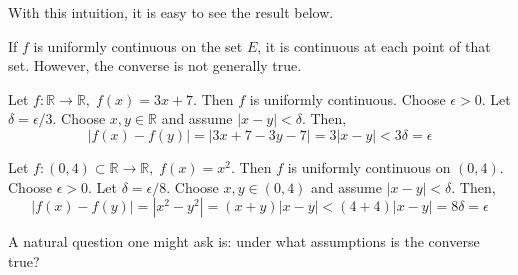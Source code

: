   With this intuition, it is easy to see the result below. 

  \begin{lemma}
    \label{thm:uniform-continuity-implies-continuity}
    If $f$ is uniformly continuous on the set $E$, it is continuous at each point of that set. However, the converse is not generally true. 
  \end{lemma}

  \begin{example}
    \label{ex:3x7-is-uniformly-continuous}
    Let $f: \mathbb{R} \to \mathbb{R}, \; f(x) = 3x+7$. Then $f$ is uniformly continuous. Choose $\epsilon > 0$. Let $\delta = \epsilon / 3$. Choose $x, y \in \mathbb{R}$ and assume $|x-y| < \delta$. Then, 
    \begin{equation}
      | f(x) - f(y) | = | 3x + 7 - 3 y - 7 | = 3 |x-y| < 3 \delta = \epsilon
    \end{equation}
  \end{example}

  \begin{example}
    \label{ex:x2-is-uniformly-continuous-on-a-bounded-interval}
    Let $f: (0, 4) \subset \mathbb{R} \to \mathbb{R}, \; f(x) = x^2$. Then $f$ is uniformly continuous on $(0, 4)$. Choose $\epsilon > 0$. Let $\delta = \epsilon / 8$. Choose $x, y \in (0, 4)$ and assume $|x-y| < \delta$. Then, 
    \begin{equation}
      |f(x) - f(y)| = |x^2 - y^2| = (x+y) |x-y| < (4+4) |x-y| = 8\delta = \epsilon
    \end{equation}
  \end{example}

  A natural question one might ask is: under what assumptions is the converse true?  

